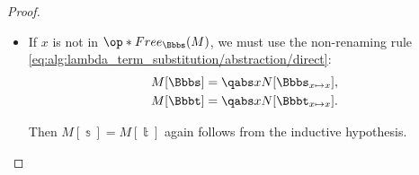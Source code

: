 \begin{proof}
\begin{itemize}
\begin{itemize}
      Since the inductive hypothesis holds for \( N \), we have
      \begin{equation*}
        N[\Bbbs_{x \mapsto u}] = N[\Bbbt_{x \mapsto u}],
      \end{equation*}
      hence \( M[\Bbbs] = M[\Bbbt] \).

      \item If \( x \) is not in \( \op*{Free}_\Bbbs(M) \), we must use the non-renaming rule \eqref{eq:alg:lambda_term_substitution/abstraction/direct}:
      \begin{align*}
        M[\Bbbs] &= \qabs x N[\Bbbs_{x \mapsto x}], \\
        M[\Bbbt] &= \qabs x N[\Bbbt_{x \mapsto x}].
      \end{align*}

      Then \( M[\Bbbs] = M[\Bbbt] \) again follows from the inductive hypothesis.
    \end{itemize}
  \end{itemize}
\end{proof}


